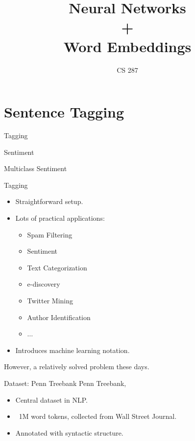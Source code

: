 \documentclass{beamer}
\title{Neural Networks\\ + \\  Word Embeddings }
\date{}
\author{CS 287}
\begin{document}
\begin{frame}
  \titlepage
\end{frame}

\section{Sentence Tagging}

\begin{frame}{Tagging}
  
\end{frame}


\begin{frame}{Sentiment}
\end{frame}

\begin{frame}{Multiclass Sentiment}
\end{frame}

\begin{frame}{Tagging}
  \begin{itemize}
  \item Straightforward setup. 
  \item Lots of practical applications:
    \begin{itemize}
    \item Spam Filtering
    \item Sentiment
    \item Text Categorization
    \item e-discovery
    \item Twitter Mining 
    \item Author Identification
    \item $\ldots$
    \end{itemize}
  \item Introduces machine learning notation.
  \end{itemize}

  \vspace{0.24cm}

  However, a relatively solved problem these days.
\end{frame}


\begin{frame}{Dataset: Penn Treebank}
  Penn Treebank, \cite{}
  \begin{itemize}
  \item Central dataset in NLP. 
  \item ~1M word tokens, collected from Wall Street Journal.
  \item Annotated with syntactic structure. 
  \end{itemize}
\end{frame}
\end{document}
